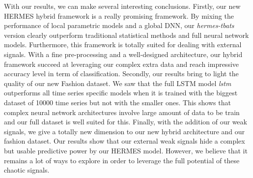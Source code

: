 \documentclass{article} %
\begin{document}
With our results, we can make several interesting conclusions. Firstly, our new HERMES hybrid framework is a really promising framework. By mixing the performance of local parametric models and a global DNN, our \textit{hermes-tbats} version clearly outperform traditional statistical methods and full neural network models. Furthermore, this framework is totally suited for dealing with external signals. With a fine pre-processing and a well-designed architecture, our hybrid framework succeed at leveraging our complex extra data and reach impressive accuracy level in term of classification. Secondly, our results bring to light the quality of our new Fashion dataset. We saw that the full LSTM model \textit{lstm} outperforms all time series specific models when it is trained with the biggest dataset of 10000 time series but not with the smaller ones. This shows that complex neural network architectures involve large amount of data to be train and our full dataset is well suited for this. Finally, with the addition of our weak signals, we give a totally new dimension to our new hybrid architecture and our fashion dataset. Our results show that our external weak signals hide a complex but usable predictive power by our HERMES model. However, we believe that it remains a lot of ways to explore in order to leverage the full potential of these chaotic signals.

\end{document}
